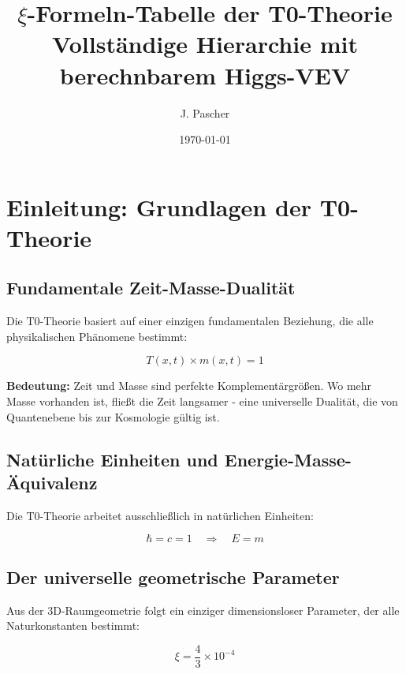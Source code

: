 \documentclass[12pt,a4paper]{article}
\begin{document}
	
	\title{\textbf{\(\xi\)-Formeln-Tabelle der T0-Theorie}\\
		\large Vollständige Hierarchie mit berechnbarem Higgs-VEV}
	
	\author{J. Pascher}
	\date{\today}
	
	\maketitle
	
	\section{Einleitung: Grundlagen der T0-Theorie}
	
	\subsection{Fundamentale Zeit-Masse-Dualität}
	
	Die T0-Theorie basiert auf einer einzigen fundamentalen Beziehung, die alle physikalischen Phänomene bestimmt:
	
	\begin{equation}
		\boxed{T(x,t) \times m(x,t) = 1}
	\end{equation}
	
	\textbf{Bedeutung:} Zeit und Masse sind perfekte Komplementärgrößen. Wo mehr Masse vorhanden ist, fließt die Zeit langsamer - eine universelle Dualität, die von Quantenebene bis zur Kosmologie gültig ist.
	
	\subsection{Natürliche Einheiten und Energie-Masse-Äquivalenz}
	
	Die T0-Theorie arbeitet ausschließlich in natürlichen Einheiten:
	
	\begin{equation}
		\boxed{\hbar = c = 1 \quad \Rightarrow \quad E = m}
	\end{equation}
	
	\subsection{Der universelle geometrische Parameter}
	
	Aus der 3D-Raumgeometrie folgt ein einziger dimensionsloser Parameter, der alle Naturkonstanten bestimmt:
	
	\begin{equation}
		\boxed{\xi = \frac{4}{3} \times 10^{-4}}
	\end{equation}
	
\end{document}

